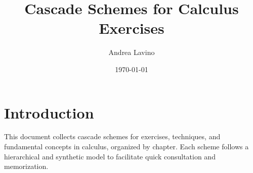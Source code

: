 \documentclass[11pt,a4paper]{article}
\title{Cascade Schemes for Calculus Exercises}
\author{Andrea Lavino}
\date{\today}
\begin{document}
\maketitle
\clearpage
\tableofcontents
\newpage

\section*{Introduction}
This document collects cascade schemes for exercises, techniques, and fundamental concepts in calculus, organized by chapter. Each scheme follows a hierarchical and synthetic model to facilitate quick consultation and memorization.






%
\end{document}
